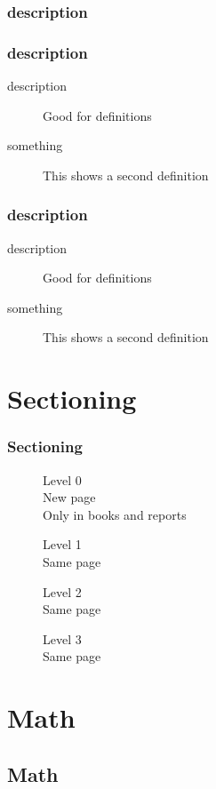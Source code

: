 \subsubsection{description}

\begin{frame}[allowframebreaks=0.8,fragile]
\frametitle{description}
\begin{teX}
\begin{description}
    \item[description] Good for definitions
    \item[something] This shows a second definition
\end{description}
\end{teX}
\framebreak
\frametitle{description}
\begin{description}
    \item[description] Good for definitions
    \item[something] This shows a second definition
\end{description}
\end{frame}


\section{Sectioning}

\begin{frame}
\frametitle{Sectioning}
\begin{description}
    \item[] Level 0\\New page\\Only 
    in books and reports
    \item[] Level 1\\Same page
    \item[] Level 2\\Same page
    \item[] Level 3\\Same page
\end{description}
\end{frame}


\section{Math}

\subsection{Math}

